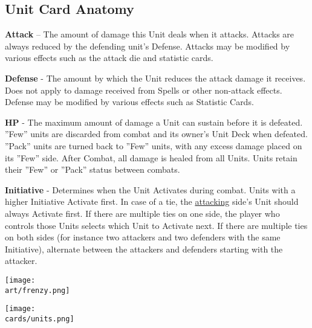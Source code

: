 \begin{multicols}{2}
\subsection*{Unit Card Anatomy}

\vspace{0pt}

\textbf{Attack} – The amount of damage this Unit deals when it attacks.
Attacks are always reduced by the defending unit's Defense.
Attacks may be modified by various effects such as the attack die and statistic cards.\par
\textbf{Defense} - The amount by which the Unit reduces the attack damage it receives.
Does not apply to damage received from Spells or other non-attack effects.
Defense may be modified by various effects such as Statistic Cards.\par
\textbf{\hypertarget{HP}{HP}} - The maximum amount of damage a Unit can sustain before it is defeated.
”Few” units are discarded from combat and its owner's Unit Deck when defeated.
”Pack” units are turned back to ”Few” units, with any excess damage placed on its ”Few” side.
After Combat, all damage is healed from all Units.
Units retain their ”Few” or ”Pack” status between combats.\par
{\hypertarget{Initiative}{\textbf{Initiative}}} - Determines when the Unit Activates during combat.
Units with a higher Initiative Activate first.
In case of a tie, the \hyperlink{Combatterminology}{attacking} side's Unit should always Activate first.
If there are multiple ties on one side, the player who controls those Units selects which Unit to Activate next.
If there are multiple ties on both sides (for instance two attackers and two defenders with the same Initiative), alternate between the attackers and defenders starting with the attacker.\par
\bigskip

\begin{scaledfigure}[blanker]
  \centering
  \texttt{[image: \\art/frenzy.png]}
\end{scaledfigure}

\begin{center}
  \texttt{[image: \\cards/units.png]}
\end{center}
\bigskip


\end{multicols}
